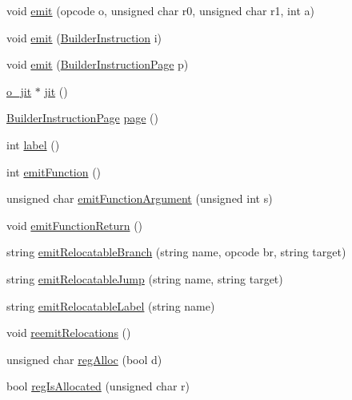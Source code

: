 \begin{DoxyCompactItemize}
\item 
void \hyperlink{classnightowl_1_1Builder_a5bf7959fb0c2ce0c306eb166fcd5ecf8}{emit} (opcode o, unsigned char r0, unsigned char r1, int a)
\item 
void \hyperlink{classnightowl_1_1Builder_aa5e591e8e6f043d8270e27f3d4be4bad}{emit} (\hyperlink{classnightowl_1_1BuilderInstruction}{Builder\-Instruction} i)
\item 
void \hyperlink{classnightowl_1_1Builder_ab2967c52565f90ceab53981dd8235466}{emit} (\hyperlink{classnightowl_1_1BuilderInstructionPage}{Builder\-Instruction\-Page} p)
\item 
\hyperlink{structo__jit}{o\-\_\-jit} $\ast$ \hyperlink{classnightowl_1_1Builder_aa9240228357ef8c48a09ffffc32569d7}{jit} ()
\item 
\hyperlink{classnightowl_1_1BuilderInstructionPage}{Builder\-Instruction\-Page} \hyperlink{classnightowl_1_1Builder_ad4d081293f3ee12bfe5cd610c5068c9c}{page} ()
\item 
int \hyperlink{classnightowl_1_1Builder_a6abd501c570a864c3567381a0d3b9339}{label} ()
\item 
int \hyperlink{classnightowl_1_1Builder_ad7c2e547af5ddfd5478efb03de54ce12}{emit\-Function} ()
\item 
unsigned char \hyperlink{classnightowl_1_1Builder_adbd0aa5aac88ce77386cc7813f532c7d}{emit\-Function\-Argument} (unsigned int s)
\item 
void \hyperlink{classnightowl_1_1Builder_a8aca1d2fd69778536a666fab504320d9}{emit\-Function\-Return} ()
\item 
string \hyperlink{classnightowl_1_1Builder_af0947c455090727a5f43a4f36643572a}{emit\-Relocatable\-Branch} (string name, opcode br, string target)
\item 
string \hyperlink{classnightowl_1_1Builder_aa1ad37c79ca9492affd266ccff0a1330}{emit\-Relocatable\-Jump} (string name, string target)
\item 
string \hyperlink{classnightowl_1_1Builder_a9bc68b24f03a893afdb21e18d5214e1a}{emit\-Relocatable\-Label} (string name)
\item 
void \hyperlink{classnightowl_1_1Builder_a15eab7a9904b55ea17be8c4a9e86a95c}{reemit\-Relocations} ()
\item 
unsigned char \hyperlink{classnightowl_1_1Builder_a5f921d6326433248f8a73be93b3c3961}{reg\-Alloc} (bool d)
\item 
bool \hyperlink{classnightowl_1_1Builder_ae433f2e3753075ae96ba032ceb701d6b}{reg\-Is\-Allocated} (unsigned char r)
\item 

\end{DoxyCompactItemize}

